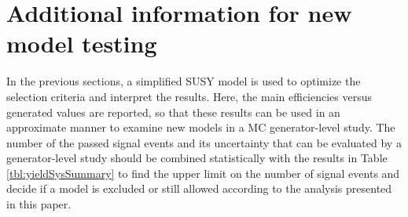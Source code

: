\section{Additional information for new model testing} 
\label{sect:model}
In the previous sections, a simplified SUSY model is used to optimize the selection criteria and interpret the results. 
Here, the main efficiencies versus generated values are reported, so that these results can be used in 
an approximate manner to examine new models in a MC generator-level study. 
The number of the passed signal events and its uncertainty that 
can be evaluated by a generator-level study 
should be combined statistically with the results in Table \ref{tbl:yieldSysSummary} to find the upper limit 
on the number of signal events
and decide if a model is excluded or still allowed according to  the analysis presented in this paper.

